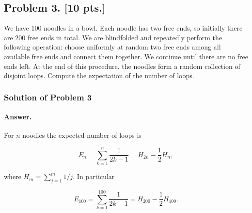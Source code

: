 \documentclass[11pt,a4paper]{article}
\begin{document}
\subsection{Problem 3. [10 pts.]}
We have 100 noodles in a bowl. Each noodle has two free ends, so initially there are 200 free ends in total. We are blindfolded and repeatedly perform the following operation: choose uniformly at random two free ends among all available free ends and connect them together. We continue until there are no free ends left. At the end of this procedure, the noodles form a random collection of disjoint loops. Compute the expectation of the number of loops.

\setcounter{section}{3}
\setcounter{definition}{0}

\subsubsection{Solution of Problem 3}

\paragraph{Answer.}

For \(n\) noodles the expected number of loops is

\[
E_{n}
=
\sum_{k=1}^{n}\frac{1}{2k-1}
=
H_{2n}-\frac12 H_{n},
\]

where \(H_{m}=\sum_{j=1}^{m}1/j\). In particular

\[
E_{100}
=
\sum_{k=1}^{100}\frac{1}{2k-1}
=
H_{200}-\frac12 H_{100}.
\]
\end{document}
